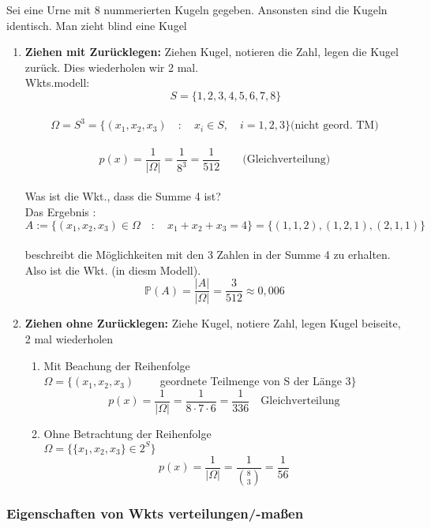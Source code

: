 \documentclass[a4paper,12pt]{article}
\newcounter{Section} %
\newcounter{Definition}[Section]
\newcounter{Beispiel}[Definition]
\newcommand{\Bsp}[3][]{ %
	\stepcounter{Beispiel}
	\begin{tcolorbox}[breakable,colback=green!0,colframe=green!50!black,title=\textbf{Beispiel\quad #1:}]
		{#2}
		{ #3}
	\end{tcolorbox}
}
\newcommand{\bspe}[1]{ %
	\begin{enumerate}[label=\alph*)]
		#1
	\end{enumerate}
}
\begin{document}
		\Bsp[(Urnenmodelle)]{
			Sei eine Urne mit 8 nummerierten Kugeln gegeben. Ansonsten sind die Kugeln identisch. Man zieht blind eine Kugel
		}{
			\bspe{
				\item \textbf{Ziehen mit Zurücklegen:} Ziehen Kugel, notieren die Zahl, legen die Kugel zurück. Dies wiederholen wir 2 mal. 
					\\Wkts.modell: 
					\[\qquad S =\{1,2,3,4,5,6,7,8\}\]\\
					\[\Omega = S^3= \{(x_1,x_2,x_3) \quad : \quad x_i \in S, \quad i=1,2,3\} \text{(nicht geord. TM)}\]\\
					\[p(x)=\frac{1}{|\Omega|} = \frac{1}{8^3}=\frac{1}{512} \qquad \text{(Gleichverteilung)}\]\\
					Was ist die Wkt., dass die Summe 4 ist?\\
					Das Ergebnis :\[A:= \{(x_1,x_2,x_3)\in \Omega \quad : \quad x_1 + x_2 + x_3 = 4\}=\{(1,1,2),(1,2,1),(2,1,1)\}\]\\
					beschreibt die Möglichkeiten mit den 3 Zahlen in der Summe 4 zu erhalten. Also ist die Wkt. (in diesm Modell).\\
					\[\mathbb{P}(A)=\frac{|A|}{|\Omega|}=\frac{3}{512} \approx 0,006\]
				\item \textbf{Ziehen ohne Zurücklegen:} Ziehe Kugel, notiere Zahl, legen Kugel beiseite, 2 mal wiederholen\\
					\begin{enumerate}[label=Fall \arabic*)]
						\item Mit Beachung der Reihenfolge\\
							$\Omega=\{(x_1,x_2,x_3)\qquad$ geordnete Teilmenge von S der Länge 3$\}$\\
							\[p(x)=\frac{1}{|\Omega|}=\frac{1}{8\cdot 7\cdot 6}= \frac{1}{336} \quad \text{Gleichverteilung}\]
						\item Ohne Betrachtung der Reihenfolge\\
							$\Omega= \{\{x_1,x_2,x_3\}\in 2^S\}$\\
							\[p(x)=\frac{1}{|\Omega|}= \frac{1}{\binom{8}{3}}= \frac{1}{56}\]	
					\end{enumerate}
				}
			}

		
		\newpage
		\subsubsection{Eigenschaften von Wkts verteilungen/-maßen}
		
\end{document}
